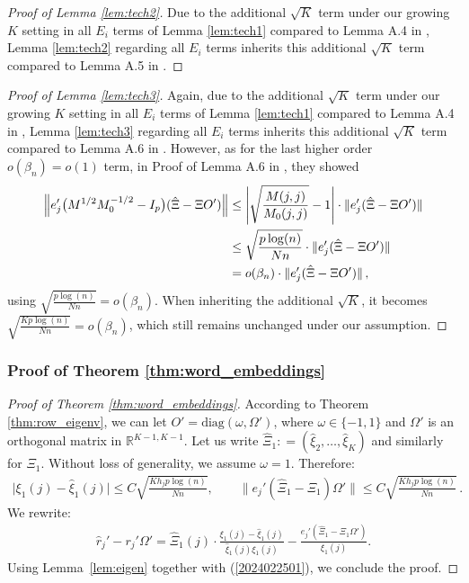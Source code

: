 \documentclass[preprint,11pt]{article}
\numberwithin{equation}{section}
\newcommand{\diag}{\mathrm{diag}}
\begin{document}
 \begin{proof}[Proof of Lemma \ref{lem:tech2}]
     Due to the additional $\sqrt{K}$ term under our growing $K$ setting in all $E_i$ terms of Lemma \ref{lem:tech1} compared to Lemma A.4 in \cite{ke2024entry}, Lemma \ref{lem:tech2} regarding all $E_i$ terms inherits this additional $\sqrt{K}$ term compared to Lemma A.5 in \cite{ke2024entry}.
 \end{proof}

  \begin{proof}[Proof of Lemma \ref{lem:tech3}]
     Again, due to the additional $\sqrt{K}$ term under our growing $K$ setting in all $E_i$ terms of Lemma \ref{lem:tech1} compared to Lemma A.4 in \cite{ke2024entry}, Lemma \ref{lem:tech3} regarding all $E_i$ terms inherits this additional $\sqrt{K}$ term compared to Lemma A.6 in \cite{ke2024entry}. However, as for the last higher order $o(\beta_n)=o(1)$ term, in Proof of Lemma A.6 in \cite{ke2024entry}, they showed
\begin{align*}
\Big\Vert e_j'  \big(M^{1/2}M_0^{-1/2} - I_p\big)(\hat\Xi - \Xi O') \Big \Vert  
&\leq  \left|\sqrt{\frac{M(j,j)}{M_0(j,j)}} - 1\right| \cdot \|e_j'(\hat \Xi - \Xi O')\| \notag\\
& \leq \sqrt{\frac{p\log(n)}{Nn}} \cdot  \|e_j'(\hat \Xi - \Xi O')\|\notag\\
& = o(\beta_n) \cdot \|e_j'(\hat \Xi - \Xi O')\| \, ,
\end{align*}
using $\sqrt{\frac{p\log(n)}{Nn}}=o(\beta_n)$. When inheriting the additional $\sqrt{K}$, it becomes $\sqrt{\frac{Kp\log(n)}{Nn}}=o(\beta_n)$, which still remains unchanged under our assumption. 
 \end{proof}


\subsubsection{Proof of Theorem \ref{thm:word_embeddings}}
\begin{proof}[Proof of Theorem \ref{thm:word_embeddings}]
    According to Theorem \ref{thm:row_eigenv}, we can let $O' = \diag(\omega,\Omega')$, where $\omega\in \{-1,1\}$ and $ \Omega'$ is an orthogonal matrix in $\mathbb R^{K-1, K-1}$. Let us write $\hat \Xi_1 : = (\hat \xi_2, \ldots, \hat \xi_K)$ and similarly for $\Xi_1$. Without loss of generality, we assume $\omega =1$. Therefore:
\begin{align} \label{2024022501}
\big| \xi_1(j) - \hat \xi_1(j)  \big|  \leq C\sqrt{\frac{Kh_j p\log(n)}{Nn}}, \qquad \big\| e_j'(\hat \Xi_1 - \Xi_1) \Omega'  \big\|  \leq C\sqrt{\frac{Kh_j p\log(n)}{Nn}} \,. 
\end{align}
We rewrite:
\begin{align*}
\hat r_j' - r_j' \Omega' =\hat \Xi_1(j) \cdot  \frac{\xi_1(j) - \hat \xi_1(j) }{\hat \xi_1(j)\xi_1(j)}  -  \frac{e_j' (\hat \Xi_1 - \Xi_1 \Omega' ) }{ \xi_1(j)}. 
\end{align*}
Using Lemma~\ref{lem:eigen} together with (\ref{2024022501}), we conclude the proof. 
\end{proof}
\end{document}
